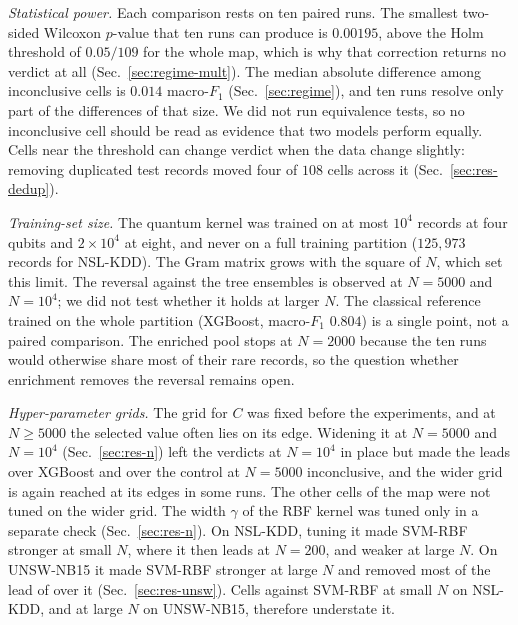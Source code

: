 \emph{Statistical power.} Each comparison rests on ten paired runs. The smallest two-sided
Wilcoxon $p$-value that ten runs can produce is $0.00195$, above the Holm threshold of
$0.05/109$ for the whole map, which is why that correction returns no verdict at all
(Sec.~\ref{sec:regime-mult}). The median absolute difference among inconclusive cells is
$0.014$ macro-$F_1$ (Sec.~\ref{sec:regime}), and ten runs resolve only part of the differences
of that size. We did not run equivalence tests, so no inconclusive cell should be read as
evidence that two models perform equally. Cells near the threshold can change verdict when the data change
slightly: removing duplicated test records moved four of $108$ cells across it
(Sec.~\ref{sec:res-dedup}).

\emph{Training-set size.} The quantum kernel was trained on at most $10^4$ records at four
qubits and $2\times10^4$ at eight, and never on a full training partition ($125{,}973$ records
for NSL-KDD). The Gram matrix grows with the square of $N$, which set this limit. The
reversal against the tree ensembles is observed at $N=5000$ and $N=10^4$; we did not test
whether it holds at larger $N$. The classical reference trained on the whole partition
(XGBoost, macro-$F_1$ $0.804$) is a single point, not a paired comparison. The
enriched pool stops at $N=2000$ because the ten runs would otherwise share most of their rare
records, so the question whether enrichment removes the reversal remains open.

\emph{Hyper-parameter grids.} The grid for $C$ was fixed before the experiments, and at
$N\ge5000$ the selected value often lies on its edge. Widening it at $N=5000$ and $N=10^4$
(Sec.~\ref{sec:res-n}) left the verdicts at $N=10^4$ in place but made the leads over XGBoost
and over the \Zmap{} control at $N=5000$ inconclusive, and the wider grid is again reached at
its edges in some runs. The other cells of the map were not tuned on the wider grid. The width $\gamma$ of the RBF kernel was
tuned only in a separate check (Sec.~\ref{sec:res-n}). On NSL-KDD, tuning it made SVM-RBF
stronger at small $N$, where it then leads \QSVM{} at $N=200$, and weaker at large $N$. On
UNSW-NB15 it made SVM-RBF stronger at large $N$ and removed most of the lead of \QSVM{} over it
(Sec.~\ref{sec:res-unsw}). Cells against SVM-RBF at small $N$ on NSL-KDD, and at large $N$ on
UNSW-NB15, therefore understate it.

